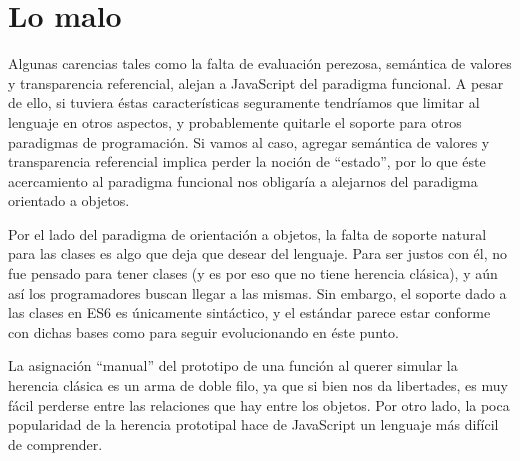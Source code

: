 \section*{Lo malo}

Algunas carencias tales como la falta de evaluación perezosa, semántica de valores y transparencia referencial, alejan a JavaScript del paradigma funcional. A pesar de ello, si tuviera éstas características seguramente tendríamos que limitar al lenguaje en otros aspectos, y probablemente quitarle el soporte para otros paradigmas de programación. Si vamos al caso, agregar semántica de valores y transparencia referencial implica perder la noción de "`estado"', por lo que éste acercamiento al paradigma funcional nos obligaría a alejarnos del paradigma orientado a objetos.

Por el lado del paradigma de orientación a objetos, la falta de soporte natural para las clases es algo que deja que desear del lenguaje. Para ser justos con él, no fue pensado para tener clases (y es por eso que no tiene herencia clásica), y aún así los programadores buscan llegar a las mismas. Sin embargo, el soporte dado a las clases en ES6 es únicamente sintáctico, y el estándar parece estar conforme con dichas bases como para seguir evolucionando en éste punto. 

La asignación "`manual"' del prototipo de una función al querer simular la herencia clásica es un arma de doble filo, ya que si bien nos da libertades, es muy fácil perderse entre las relaciones que hay entre los objetos. Por otro lado, la poca popularidad de la herencia prototipal hace de JavaScript un lenguaje más difícil de comprender.